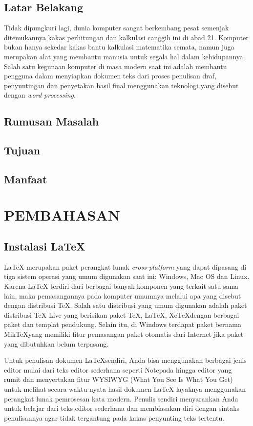 \documentclass{ta-scientics-matematika-its}
\begin{document}
        \section{Latar Belakang}
            Tidak dipungkuri lagi, dunia komputer sangat berkembang pesat semenjak ditemukannya kakas perhitungan dan kalkulasi canggih ini di abad 21. Komputer bukan hanya sekedar kakas bantu kalkulasi matematika semata, namun juga merupakan alat yang membantu manusia untuk segala hal dalam kehidupannya. Salah satu kegunaan komputer di masa modern saat ini adalah membantu pengguna dalam menyiapkan dokumen teks dari proses penulisan draf, penyuntingan dan penyetakan hasil final menggunakan teknologi yang disebut dengan \emph{word processing}.

        \section{Rumusan Masalah}
        \section{Tujuan}
        \section{Manfaat}

    \chapter{PEMBAHASAN}
        \section{Instalasi \LaTeX{}}
        \LaTeX{} merupakan paket perangkat lunak \emph{cross-platform} yang dapat dipasang di tiga sistem operasi yang umum digunakan saat ini: Windows, Mac OS dan Linux. Karena \LaTeX{} terdiri dari berbagai banyak komponen yang terkait satu sama lain, maka pemasangannya pada komputer umumnya melalui apa yang disebut dengan distribusi \TeX{}. Salah satu distribusi yang umum digunakan adalah paket distribusi \TeX{} Live yang berisikan paket \TeX, \LaTeX, Xe\TeX dengan berbagai paket dan templat pendukung. Selain itu, di Windows terdapat paket bernama Mik\TeX yang memiliki fitur pemasangan paket otomatis dari Internet jika paket yang dibutuhkan belum terpasang.

        Untuk penulisan dokumen \LaTeX sendiri, Anda bisa menggunakan berbagai jenis editor mulai dari teks editor sederhana seperti Notepada hingga editor yang rumit dan menyertakan fitur WYSIWYG (What You See Is What You Get) untuk melihat secara waktu-nyata hasil dokumen \LaTeX{} layaknya menggunakan perangkat lunak pemrosesan kata modern. Penulis sendiri menyarankan Anda untuk belajar dari teks editor sederhana dan membiasakan diri dengan sintaks penulisannya agar tidak tergantung pada kakas penyunting teks tertentu.
\end{document}

